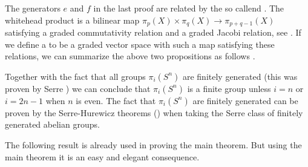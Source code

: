 The generators $e$ and $f$ in the last proof are related by the so callend . The whitehead product is a bilinear map $\pi_p(X) \times \pi_q(X) \to \pi_{p+q-1}(X)$ satisfying a graded commutativity relation and a graded Jacobi relation, see \cite{felix}. If we define a  to be a graded vector space with such a map satisfying these relations, we can summarize the above two propositions as follows \cite{berglund}.


Together with the fact that all groups $\pi_i(S^n)$ are finitely generated (this was proven by Serre \cite{serre}) we can conclude that $\pi_i(S^n)$ is a finite group unless $i=n$ or $i=2n-1$ when $n$ is even. The fact that $\pi_i(S^n)$ are finitely generated can be proven by the Serre-Hurewicz theorems () when taking the Serre class of finitely generated abelian groups.

The following result is already used in proving the main theorem. But using the main theorem it is an easy and elegant consequence.


